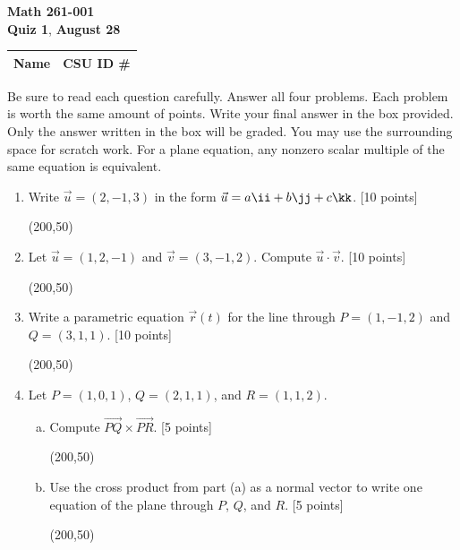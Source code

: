 \documentclass[12pt]{exam}
\newcommand{\class}{Math 261-001}
\newcommand{\examnum}{Quiz 1}
\newcommand{\examdate}{August 28}
\begin{document}
\pagestyle{plain}
\thispagestyle{empty}

\noindent
\textbf{\class}\\
\textbf{\examnum}, \textbf{\examdate} \\

\setlength{\tabcolsep}{3.5cm}
\renewcommand{\arraystretch}{1.5}
\setlength\extrarowheight{1cm}
\begin{tabular}{ |c|c| }
 \hline
 Name   & CSU ID \#  \\
 \hline
\end{tabular}

\vspace{10pt}

Be sure to read each question carefully. Answer all four problems. Each
problem is worth the same amount of points. Write your final answer
in the box provided. Only the answer written in the box will be graded. You
may use the surrounding space for scratch work. For a plane equation, any
nonzero scalar multiple of the same equation is equivalent.

\begin{enumerate}

\item Write $\vec{u}=(2,-1,3)$ in the form
$\vec{u}=a\ii+b\jj+c\kk$. \hfill [10 points]

\vfill
\begin{flushright}
\framebox(200,50){}
\end{flushright}

\item Let $\vec{u}=(1,2,-1)$ and
$\vec{v}=(3,-1,2)$. Compute
$\vec{u}\cdot\vec{v}$. \hfill [10 points]

\vfill
\begin{flushright}
\framebox(200,50){}
\end{flushright}

\newpage

\item Write a parametric equation $\vec{r}(t)$ for the line through
$P=(1,-1,2)$ and $Q=(3,1,1)$. \hfill [10 points]

\vfill
\begin{flushright}
\framebox(200,50){}
\end{flushright}

\item Let $P=(1,0,1)$, $Q=(2,1,1)$, and $R=(1,1,2)$.
\begin{enumerate}[(a)]
  \item Compute $\overrightarrow{PQ}\times\overrightarrow{PR}$.
  \hfill [5 points]

  \vfill
\begin{flushright}
\framebox(200,50){}
\end{flushright}
  \item Use the cross product from part (a) as a normal vector to write one
  equation of the plane through $P$, $Q$, and $R$. \hfill [5 points]
\vfill
\begin{flushright}
\framebox(200,50){}
\end{flushright}
\end{enumerate}


\end{enumerate}
\end{document}
